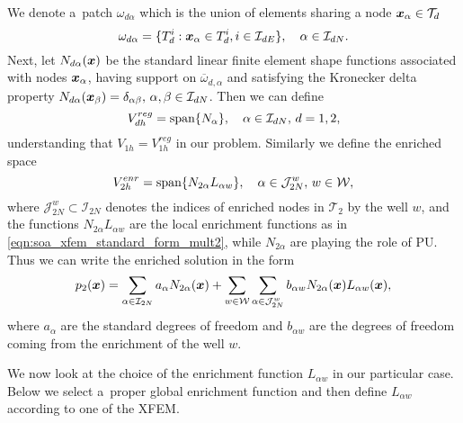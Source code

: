 We denote a~patch $\omega_{d\alpha}$ which is the union of elements sharing a node $\mathbf{\boldsymbol{x}}_\alpha\in\mathcal{T}_d$
\[
    \omega_{d\alpha} = \{ T_d^i: \mathbf{\boldsymbol{x}}_\alpha \in T_d^i, i\in\mathcal{I}_{dE}\}, \quad \alpha\in\mathcal{I}_{dN}.
\]
Next, let $N_{d \alpha}(\mathbf{\boldsymbol{x}})$ be the standard linear finite element shape functions associated with
nodes $\mathbf{\boldsymbol{x}}_\alpha$, having support on $\overbar\omega_{d,\alpha}$ and satisfying the Kronecker delta property
$N_{d \alpha}(\mathbf{\boldsymbol{x}}_\beta)=\delta_{\alpha\beta},\, \alpha,\beta\in\mathcal{I}_{dN}$.
Then we can define
\begin{equation}
    V_{dh}^{reg} = \textrm{span}\{N_\alpha\}, \quad \alpha\in\mathcal{I}_{dN},\, d=1,2,
\end{equation}
understanding that $V_{1h} = V_{1h}^{reg}$ in our problem.
Similarly we define the enriched space
\begin{equation}
    V_{2h}^{enr} = \textrm{span}\{N_{2\alpha} L_{\alpha w}\}, \quad \alpha\in\mathcal{J}^w_{2N},\, w\in\mathcal{W},
\end{equation}
where $\mathcal{J}^w_{2N}\subset\mathcal{I}_{2N}$ denotes the indices of enriched nodes in $\mathcal{T}_2$ 
by the well $w$, and
the functions $N_{2\alpha}L_{\alpha w}$ are the local enrichment functions as in \eqref{eqn:soa_xfem_standard_form_mult2},
while $N_{2\alpha}$ are playing the role of PU.
Thus we can write the enriched solution in the form
\begin{equation} \label{eqn:prim_xfem_standard_form}
  p_2(\mathbf{\boldsymbol{x}}) = \sum_{\alpha\in\mathcal{I}_{2N}}a_\alpha N_{2\alpha}(\mathbf{\boldsymbol{x}})
    + \sum_{w\in\mathcal{W}} \sum_{\alpha\in\mathcal{J}^w_{2N}} b_{\alpha w} N_{2\alpha}(\mathbf{\boldsymbol{x}}) L_{\alpha w}(\mathbf{\boldsymbol{x}}),
\end{equation}
where $a_\alpha$ are the standard degrees of freedom and $b_{\alpha w}$ are the degrees of freedom coming from
the enrichment of the well $w$.

We now look at the choice of the enrichment function $L_{\alpha w}$ in our particular case.
Below we select a~proper global enrichment function and then define $L_{\alpha w}$ according
to one of the XFEM.




